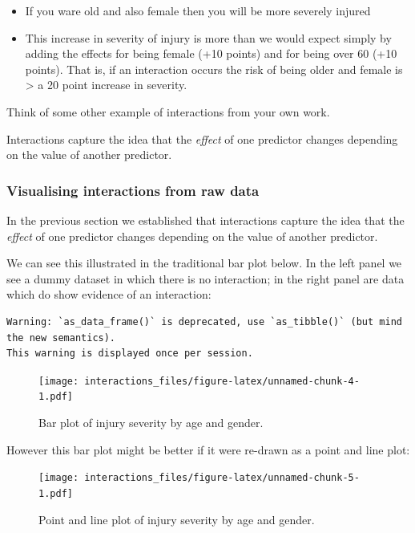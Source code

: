 \documentclass[]{article}
\providecommand{\tightlist}{%
  \setlength{\itemsep}{0pt}\setlength{\parskip}{0pt}}
\begin{document}
\begin{itemize}
\tightlist
\item
  If you ware old and also female then you will be more severely injured
\item
  This increase in severity of injury is more than we would expect simply by
  adding the effects for being female (+10 points) and for being over 60 (+10
  points). That is, if an interaction occurs the risk of being older and
  female is \textgreater{} a 20 point increase in severity.
\end{itemize}

{Think of some other example of interactions from your own work.}

{Interactions capture the idea that the \emph{effect} of one predictor changes
depending on the value of another predictor.}

\hypertarget{visualising-interactions-from-raw-data}{%
\subsubsection*{Visualising interactions from raw data}\label{visualising-interactions-from-raw-data}}

In the previous section we established that interactions capture the idea that
the \emph{effect} of one predictor changes depending on the value of another
predictor.

We can see this illustrated in the traditional bar plot below. In the left panel
we see a dummy dataset in which there is no interaction; in the right panel are
data which do show evidence of an interaction:

\begin{verbatim}
Warning: `as_data_frame()` is deprecated, use `as_tibble()` (but mind the new semantics).
This warning is displayed once per session.
\end{verbatim}

\begin{figure}
\centering
\texttt{[image: interactions\_files/figure-latex/unnamed-chunk-4-1.pdf]}
\caption{\label{fig:unnamed-chunk-4}Bar plot of injury severity by age and gender.}
\end{figure}

However this bar plot might be better if it were re-drawn as a point and line
plot:

\begin{figure}
\centering
\texttt{[image: interactions\_files/figure-latex/unnamed-chunk-5-1.pdf]}
\caption{\label{fig:unnamed-chunk-5}Point and line plot of injury severity by age and gender.}
\end{figure}
\end{document}
